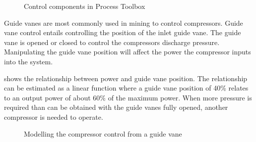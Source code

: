 	\begin{figure}[h]
		\centering
		\caption[Control components in Process Toolbox]{Control components in Process Toolbox}
		\label{fig: Controller models}
	\end{figure}
		Guide vanes are most commonly used in mining to control compressors. Guide vane control entails controlling the position of the inlet guide vane. The guide vane is opened or closed to control the compressors discharge pressure. Manipulating the guide vane position will affect the power the compressor inputs into the system. 
		\par 
		 shows the relationship between power and guide vane position. The relationship can be estimated as a linear function where a guide vane position of 40\% relates to an output power of about 60\% of the maximum power. When more pressure is required than can be obtained with the guide vanes fully opened, another compressor is needed to operate. 
		\begin{figure}[h]
			\centering
			\fbox{}
			\caption{Modelling the compressor control from a guide vane\protect \footnotemark[1]}
			\label{fig: Guide vane position}
		\end{figure}
	
	
